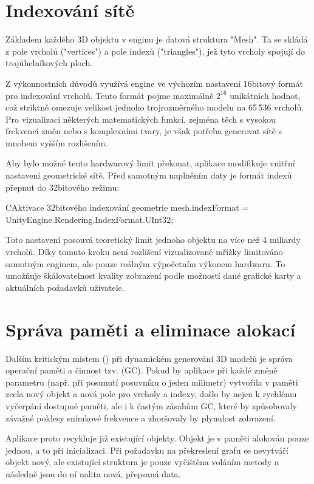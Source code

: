 \documentclass[czech, kiv, sem, he, iso690alph, pdf,viewonly]{fasthesis}
\begin{document}
\section{Indexování sítě}
Základem každého 3D objektu v enginu  je datová struktura \command"Mesh". 
Ta se skládá z pole vrcholů (\command"vertices") a pole indexů (\command"triangles"), jež tyto vrcholy spojují do trojúhelníkových ploch. 

Z výkonnostních důvodů využívá engine  ve výchozím nastavení 16bitový formát pro indexování vrcholů. 
Tento formát pojme maximálně $2^{16}$ unikátních hodnot, což striktně omezuje velikost jednoho trojrozměrného modelu na 65\,536 vrcholů. 
Pro vizualizaci některých matematických funkcí, zejména těch s vysokou frekvencí změn nebo s komplexními tvary, je však potřeba generovat sítě s mnohem vyšším rozlišením.

Aby bylo možné tento hardwarový limit překonat, aplikace modifikuje vnitřní nastavení geometrické sítě. 
Před samotným naplněním daty je formát indexů přepnut do 32bitového režimu:

\begin{code}{C}{Aktivace 32bitového indexování geometrie\label{lst:index_format}}
mesh.indexFormat = UnityEngine.Rendering.IndexFormat.UInt32;
\end{code}

Toto nastavení posouvá teoretický limit jednoho objektu na více než 4 miliardy vrcholů. 
Díky tomuto kroku není rozlišení vizualizované mřížky limitováno samotným enginem, ale pouze reálným výpočetním výkonem hardwaru. 
To umožňuje škálovatelnost kvality zobrazení podle možností dané grafické karty a aktuálních požadavků uživatele.

\section{Správa paměti a eliminace alokací}
Dalším kritickým místem () při dynamickém generování 3D modelů je správa operační paměti a činnost tzv.  (GC). 
Pokud by aplikace při každé změně parametru (např. při posunutí posuvníku o jeden milimetr) vytvořila v paměti zcela nový objekt  a nová pole pro vrcholy a indexy, 
došlo by nejen k rychlému vyčerpání dostupné paměti, ale i k častým zásahům GC, které by způsobovaly závažné poklesy snímkové frekvence a zhoršovaly by plynulost zobrazení.

Aplikace proto recykluje již existující objekty. 
Objekt  je v paměti alokován pouze jednou, a to při inicializaci. 
Při požadavku na překreslení grafu se nevytváří objekt nový, ale existující struktura je pouze vyčištěna voláním metody  a následně jsou do ní nalita nová, přepsaná data. 
\end{document}
